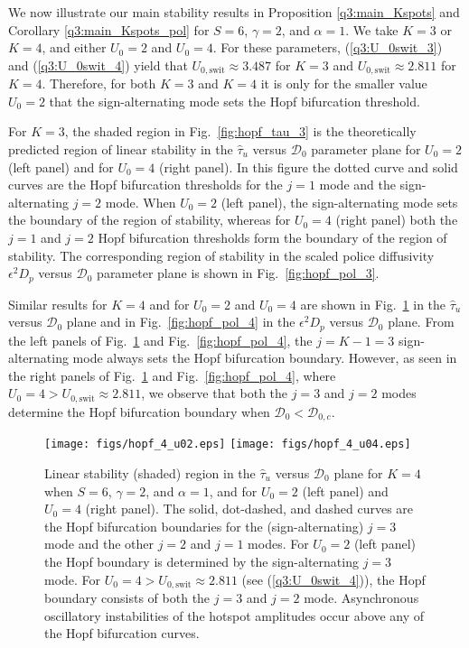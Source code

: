 \documentclass{article}%
\begin{document}
We now illustrate our main stability results in Proposition
\ref{q3:main_Kspots} and Corollary \ref{q3:main_Kspots_pol} for 
$S=6$, $\gamma=2$, and $\alpha=1$. We take $K=3$ or $K=4$, and either
$U_0=2$ and $U_0=4$. For these parameters, (\ref{q3:U_0swit_3}) and
(\ref{q3:U_0swit_4}) yield that $U_{0,\textrm{swit}}\approx 3.487$ for
$K=3$ and $U_{0,\textrm{swit}}\approx 2.811$ for $K=4$. Therefore, for
both $K=3$ and $K=4$ it is only for the smaller value $U_0=2$ that the
sign-alternating mode sets the Hopf bifurcation threshold.

For $K=3$, the shaded region in Fig.~\ref{fig:hopf_tau_3} is the
theoretically predicted region of linear stability in the
$\hat{\tau}_u$ versus ${\mathcal D}_0$ parameter plane for $U_0=2$
(left panel) and for $U_0=4$ (right panel). In this figure the dotted
curve and solid curves are the Hopf bifurcation thresholds for the
$j=1$ mode and the sign-alternating $j=2$ mode. When $U_0=2$ (left
panel), the sign-alternating mode sets the boundary of the region of
stability, whereas for $U_0=4$ (right panel) both the $j=1$ and $j=2$
Hopf bifurcation thresholds form the boundary of the region of
stability. The corresponding region of stability in the scaled police
diffusivity $\epsilon^2 D_p$ versus ${\mathcal D}_0$ parameter plane
is shown in Fig.~\ref{fig:hopf_pol_3}.

Similar results for $K=4$ and for $U_0=2$ and $U_0=4$ are shown in
Fig.~\ref{fig:hopf_tau_4} in the $\hat{\tau}_u$ versus ${\mathcal D}_0$
plane and in Fig.~\ref{fig:hopf_pol_4} in the $\epsilon^2 D_p$ versus
${\mathcal D}_0$ plane. From the left panels of
Fig.~\ref{fig:hopf_tau_4} and Fig.~\ref{fig:hopf_pol_4}, the $j=K-1=3$
sign-alternating mode always sets the Hopf bifurcation boundary. However,
as seen in the right panels of Fig.~\ref{fig:hopf_tau_4} and 
Fig.~\ref{fig:hopf_pol_4}, where $U_0=4>U_{0,\textrm{swit}}\approx 2.811$, we 
observe that both the $j=3$ and $j=2$ modes determine the Hopf bifurcation
boundary when ${\mathcal D}_0<{\mathcal D}_{0,c}$.


\begin{figure}[htbp]
\centering
\texttt{[image: figs/hopf\_4\_u02.eps]}
\texttt{[image: figs/hopf\_4\_u04.eps]}
\caption{\label{fig:hopf_tau_4} Linear stability (shaded) region in
  the $\hat{\tau}_u$ versus ${\mathcal D}_0$ plane for $K=4$ when
  $S=6$, $\gamma=2$, and $\alpha=1$, and for $U_0=2$ (left panel) and
  $U_{0}=4$ (right panel). The solid, dot-dashed, and dashed curves
  are the Hopf bifurcation boundaries for the (sign-alternating) $j=3$
  mode and the other $j=2$ and $j=1$ modes. For $U_0=2$ (left panel)
  the Hopf boundary is determined by the sign-alternating $j=3$ mode.
  For $U_0=4>U_{0,\textrm{swit}}\approx 2.811$ (see
  (\ref{q3:U_0swit_4})), the Hopf boundary consists of both the $j=3$
  and $j=2$ mode. Asynchronous oscillatory instabilities of the
  hotspot amplitudes occur above any of the Hopf bifurcation curves.}
\end{figure}
\end{document}
